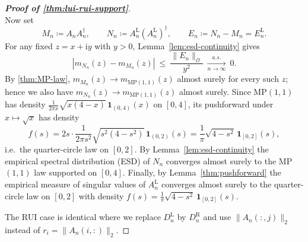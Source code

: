\documentclass[11pt,a4paper]{article}
\newcommand{\be}{\begin{equation}}
\newcommand{\ee}{\end{equation}}
\newcommand{\op}{\mathcal{O}}
\begin{document}
\begin{proof}[\textbf{Proof of \cref{thm:lui-rui-support}}]
\begin{equation}
\end{equation}
Now set
\begin{equation}
M_n\coloneq A_nA_n^\dagger,\qquad N_n\coloneq A^\mathrm{L}_n(A^\mathrm{L}_n)^\dagger,\qquad E_n\coloneq N_n-M_n=E^\mathrm{L}_n.
\end{equation}
For any fixed $z=x+\mathrm{i}y$ with $y>0$, Lemma~\ref{lem:esd-continuity} gives
\begin{equation}
|m_{N_n}(z)-m_{M_n}(z)|\ \le\ \frac{\|E_n\|_{\op}}{y^2}\ \xrightarrow[n\to\infty]{a.s.}\ 0.
\end{equation}
By \cref{thm:MP-law}, $m_{M_n}(z)\to m_{\mathrm{MP}(1,1)}(z)$ almost surely for every such $z$; hence we also have
$m_{N_n}(z)\to m_{\mathrm{MP}(1,1)}(z)$ almost surely. Since $\mathrm{MP}(1,1)$ has density $\frac{1}{2\pi x}\sqrt{x(4-x)}\,\mathbf 1_{(0,4)}(x)$ on $[0,4]$, its pushforward under $x\mapsto \sqrt{x}$ has density
\be
f(s)=2s\cdot \frac{1}{2\pi s^2}\sqrt{s^2(4-s^2)}\,\mathbf 1_{(0,2)}(s)=\frac{1}{\pi}\sqrt{4-s^2}\,\mathbf 1_{[0,2]}(s),
\ee
i.e.\ the quarter-circle law on $[0,2]$.  By Lemma~\ref{lem:esd-continuity} the empirical spectral distribution (ESD) of $N_n$ converges almost surely to the MP$(1,1)$ law supported on $[0,4]$. Finally, by Lemma~\ref{thm:pushforward} the empirical measure of singular values of $A^\mathrm{L}_n$ converges almost surely to the quarter-circle law on $[0,2]$ with density $f(s)=\frac{1}{\pi}\sqrt{4-s^2}\,\mathbf{1}_{[0,2]}(s)$.

The RUI case is identical where we replace $D^\mathrm{L}_{n}$ by $D^\mathrm{R}_{n}$ and use $\|A_n(:,j)\|_2$ instead of $r_i=\|A_n(i,:)\|_2$.
\end{proof}
\end{document}

